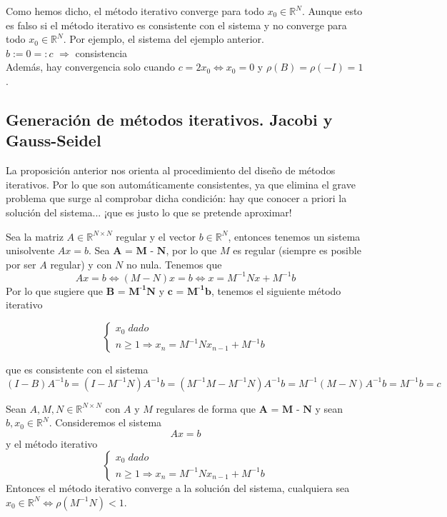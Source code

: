 \begin{nota}
Como hemos dicho, el método iterativo converge para todo $x_0 \in \mathbb{R}^N$. Aunque esto es falso si el método iterativo es consistente con el sistema y no converge para todo $x_0 \in \mathbb{R}^N$. Por ejemplo, el sistema del ejemplo anterior.\\
$b := 0 =: c$ $\Rightarrow$ consistencia\\
Además, hay convergencia solo cuando $c = 2x_0 \Leftrightarrow x_0 = 0$ y $\rho (B) = \rho (-I) = 1$.
\end{nota}

\subsection{Generación de métodos iterativos. Jacobi y Gauss-Seidel}
La proposición anterior nos orienta al procedimiento del diseño de métodos iterativos. Por lo que son automáticamente consistentes, ya que elimina el grave problema que surge al comprobar dicha condición: hay que conocer a priori la solución del sistema... ¡que es justo lo que se pretende aproximar!

Sea la matriz $A \in \mathbb{R}^{N \times N}$ regular y el vector $b \in \mathbb{R}^N$, entonces tenemos un sistema unisolvente $Ax = b$. Sea $\textbf{A =  M - N}$, por lo que $M$ es regular (siempre es posible por ser $A$ regular) y  con $N$ no nula. Tenemos que
\[ Ax = b \Leftrightarrow (M-N)x = b \Leftrightarrow x = M^{-1}Nx + M^{-1}b \]
Por lo que sugiere que $\textbf{B = M} ^{ \textbf{-1} } \textbf{N}$ y $\textbf{c = M} ^{\textbf{-1} } \textbf{b}$, tenemos el siguiente método iterativo

\[ \left\{ \begin{array}{c}
x_0 \; dado \\
n \geq 1 \Rightarrow x_n = M^{-1}Nx_{n-1} + M^{-1}b
\end{array}
\right. \]

que es consistente con el sistema
\[ (I-B)A^{-1}b = (I-M^{-1}N)A^{-1}b = (M^{-1}M-M^{-1}N)A^{-1}b = M^{-1}(M-N)A^{-1}b = M^{-1}b = c \]


\begin{ncor}
Sean $A, M, N \in \mathbb{R}^{N \times N}$ con $A$ y $M$ regulares de forma que $\textbf{A = M - N}$ y sean $b, x_0 \in \mathbb{R}^N$. Consideremos el sistema $$Ax = b$$ y el método iterativo
\[ \left\{ \begin{array}{c}
x_0 \; dado \\
n \geq 1 \Rightarrow x_n = M^{-1}Nx_{n-1} + M^{-1}b
\end{array}
\right. \]
Entonces el método iterativo converge a la solución del sistema, cualquiera sea $x_0 \in \mathbb{R}^N \Leftrightarrow \rho (M^{-1}N) < 1$.
\end{ncor}

